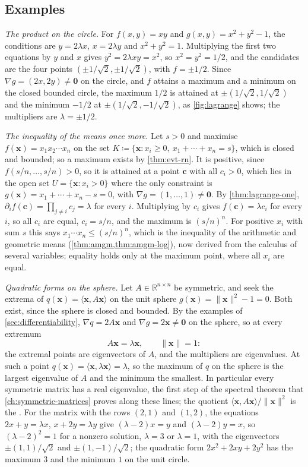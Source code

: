 \subsection{Examples}

\emph{The product on the circle.} For $f(x,y)=xy$ and $g(x,y)=x^2+y^2-1$, the conditions are $y=2\lambda x$, $x=2\lambda y$ and $x^2+y^2=1$. Multiplying the first two equations by $y$ and $x$ gives $y^2=2\lambda xy=x^2$, so $x^2=y^2=1/2$, and the candidates are the four points $(\pm1/\sqrt2,\pm1/\sqrt2)$, with $f=\pm1/2$. Since $\nabla g=(2x,2y)\ne\mathbf0$ on the circle, and $f$ attains a maximum and a minimum on the closed bounded circle, the maximum $1/2$ is attained at $\pm(1/\sqrt2,1/\sqrt2)$ and the minimum $-1/2$ at $\pm(1/\sqrt2,-1/\sqrt2)$, as \cref{fig:lagrange} shows; the multipliers are $\lambda=\pm1/2$.

\emph{The inequality of the means once more.} Let $s>0$ and maximise $f(\mathbf x)=x_1x_2\cdots x_n$ on the set $K\coloneqq\{\mathbf x: x_i\ge0,\ x_1+\cdots+x_n=s\}$, which is closed and bounded; so a maximum exists by \cref{thm:evt-rn}. It is positive, since $f(s/n,\ldots,s/n)>0$, so it is attained at a point $\mathbf c$ with all $c_i>0$, which lies in the open set $U=\{\mathbf x: x_i>0\}$ where the only constraint is $g(\mathbf x)=x_1+\cdots+x_n-s=0$, with $\nabla g=(1,\ldots,1)\ne\mathbf0$. By \cref{thm:lagrange-one}, $\partial_if(\mathbf c)=\prod_{j\ne i}c_j=\lambda$ for every $i$. Multiplying by $c_i$ gives $f(\mathbf c)=\lambda c_i$ for every $i$, so all $c_i$ are equal, $c_i=s/n$, and the maximum is $(s/n)^n$. For positive $x_i$ with sum $s$ this says $x_1\cdots x_n\le(s/n)^n$, which is the inequality of the arithmetic and geometric means (\cref{thm:amgm,thm:amgm-log}), now derived from the calculus of several variables; equality holds only at the maximum point, where all $x_i$ are equal.

\emph{Quadratic forms on the sphere.} Let $A\in\mathbb R^{n\times n}$ be symmetric, and seek the extrema of $q(\mathbf x)=\langle\mathbf x,A\mathbf x\rangle$ on the unit sphere $g(\mathbf x)=\|\mathbf x\|^2-1=0$. Both exist, since the sphere is closed and bounded. By the examples of \cref{sec:differentiability}, $\nabla q=2A\mathbf x$ and $\nabla g=2\mathbf x\ne\mathbf0$ on the sphere, so at every extremum
\[
A\mathbf x=\lambda\mathbf x,\qquad\|\mathbf x\|=1 :
\]
the extremal points are eigenvectors of $A$, and the multipliers are eigenvalues. At such a point $q(\mathbf x)=\langle\mathbf x,\lambda\mathbf x\rangle=\lambda$, so the maximum of $q$ on the sphere is the largest eigenvalue of $A$ and the minimum the smallest. In particular every symmetric matrix has a real eigenvalue, the first step of the spectral theorem that \cref{ch:symmetric-matrices} proves along these lines; the quotient $\langle\mathbf x,A\mathbf x\rangle/\|\mathbf x\|^2$ is the . For the matrix with the rows $(2,1)$ and $(1,2)$, the equations $2x+y=\lambda x$, $x+2y=\lambda y$ give $(\lambda-2)x=y$ and $(\lambda-2)y=x$, so $(\lambda-2)^2=1$ for a nonzero solution, $\lambda=3$ or $\lambda=1$, with the eigenvectors $\pm(1,1)/\sqrt2$ and $\pm(1,-1)/\sqrt2$; the quadratic form $2x^2+2xy+2y^2$ has the maximum $3$ and the minimum $1$ on the unit circle.

